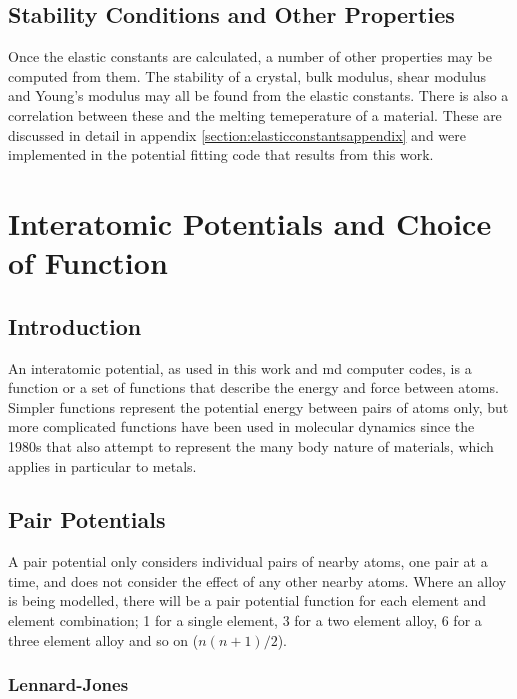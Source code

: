 \FloatBarrier
\subsection{Stability Conditions and Other Properties}

Once the elastic constants are calculated, a number of other properties may be computed from them.  The stability of a crystal, bulk modulus, shear modulus and Young's modulus may all be found from the elastic constants.  There is also a correlation between these and the melting temeperature of a material.  These are discussed in detail in appendix \ref{section:elasticconstantsappendix} and were implemented in the potential fitting code that results from this work.




\FloatBarrier
\section[Choice of Function]{Interatomic Potentials and Choice of Function}

\subsection{Introduction}

An interatomic potential, as used in this work and \acrshort{md} computer codes, is a function or a set of functions that describe the energy and force between atoms.  Simpler functions represent the potential energy between pairs of atoms only, but more complicated functions have been used in molecular dynamics since the 1980s that also attempt to represent the many body nature of materials, which applies in particular to metals.


\subsection{Pair Potentials}

A pair potential only considers individual pairs of nearby atoms, one pair at a time, and does not consider the effect of any other nearby atoms.  Where an alloy is being modelled, there will be a pair potential function for each element and element combination; 1 for a single element, 3 for a two element alloy, 6 for a three element alloy and so on ($n (n + 1) / 2$).


\FloatBarrier
\subsubsection{Lennard-Jones}
\label{section:LennardJones}

